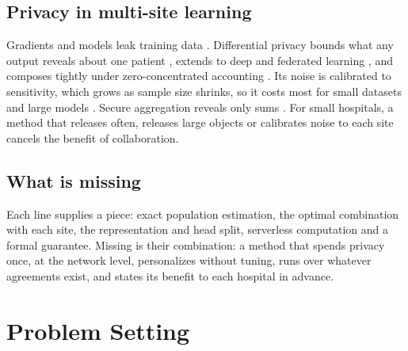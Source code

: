 \documentclass[acmsmall,screen,review]{acmart}
\theoremstyle{acmdefinition}
\begin{document}
\subsection{Privacy in multi-site learning}\label{sec:dp}

Gradients and models leak training data \cite{geiping2020inverting,hatamizadeh2023do,shokri2017membership,zhu2019deep}. Differential privacy bounds what any output reveals about one patient \cite{dwork2006calibrating,dwork2014algorithmic}, extends to deep and federated learning \cite{abadi2016deep,mcmahan2018learning,mironov2017renyi}, and composes tightly under zero-concentrated accounting \cite{bun2016concentrated}. Its noise is calibrated to sensitivity, which grows as sample size shrinks, so it costs most for small datasets and large models \cite{bagdasaryan2019differential,tramer2021differentially}. Secure aggregation reveals only sums \cite{bonawitz2017practical}. For small hospitals, a method that releases often, releases large objects or calibrates noise to each site cancels the benefit of collaboration.

\subsection{What is missing}\label{sec:gap}

Each line supplies a piece: exact population estimation, the optimal combination with each site, the representation and head split, serverless computation and a formal guarantee. Missing is their combination: a method that spends privacy once, at the network level, personalizes without tuning, runs over whatever agreements exist, and states its benefit to each hospital in advance.

\section{Problem Setting}\label{sec:problem}
\end{document}
